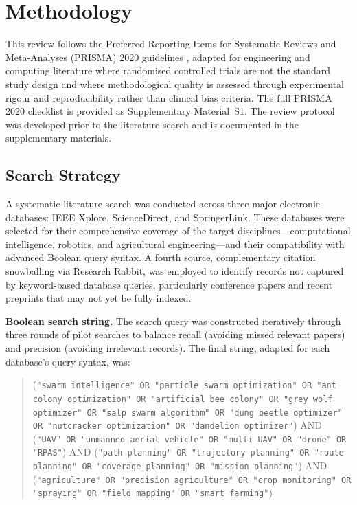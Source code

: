 \documentclass[review,3p,times]{elsarticle}
\begin{document}
\section{Methodology}

This review follows the Preferred Reporting Items for Systematic Reviews and Meta-Analyses (PRISMA) 2020 guidelines \cite{page2021}, adapted for engineering and computing literature where randomised controlled trials are not the standard study design and where methodological quality is assessed through experimental rigour and reproducibility rather than clinical bias criteria. The full PRISMA 2020 checklist is provided as Supplementary Material~S1. The review protocol was developed prior to the literature search and is documented in the supplementary materials.

\subsection{Search Strategy}

A systematic literature search was conducted across three major electronic databases: IEEE Xplore, ScienceDirect, and SpringerLink. These databases were selected for their comprehensive coverage of the target disciplines---computational intelligence, robotics, and agricultural engineering---and their compatibility with advanced Boolean query syntax. A fourth source, complementary citation snowballing via Research Rabbit, was employed to identify records not captured by keyword-based database queries, particularly conference papers and recent preprints that may not yet be fully indexed.

\textbf{Boolean search string.} The search query was constructed iteratively through three rounds of pilot searches to balance recall (avoiding missed relevant papers) and precision (avoiding irrelevant records). The final string, adapted for each database's query syntax, was:

\begin{quote}
\small
(\texttt{"swarm intelligence" OR "particle swarm optimization" OR "ant colony optimization"
OR "artificial bee colony" OR "grey wolf optimizer" OR "salp swarm algorithm"
OR "dung beetle optimizer" OR "nutcracker optimization" OR "dandelion optimizer"})
AND (\texttt{"UAV" OR "unmanned aerial vehicle" OR "multi-UAV" OR "drone" OR "RPAS"})
AND (\texttt{"path planning" OR "trajectory planning" OR "route planning"
OR "coverage planning" OR "mission planning"})
AND (\texttt{"agriculture" OR "precision agriculture" OR "crop monitoring"
OR "spraying" OR "field mapping" OR "smart farming"})
\end{quote}
\end{document}
